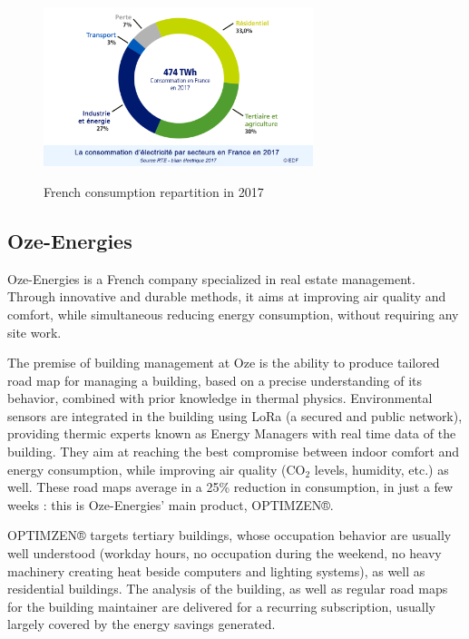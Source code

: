 \documentclass[12pt]{article}
\begin{document}
\begin{figure}
    \caption{French consumption repartition in 2017}
    \centering
    \includegraphics[width=0.7\textwidth]{energie_consommation_secteurs_2018.png}
    \label{fig:consumption_repartition}
\end{figure}

\subsection{Oze-Energies}

Oze-Energies is a French company specialized in real estate management. Through innovative and durable methods, it aims at improving air quality and comfort, while simultaneous reducing energy consumption, without requiring any site work.

The premise of building management at Oze is the ability to produce tailored road map for managing a building, based on a precise understanding of its behavior, combined with prior knowledge in thermal physics. Environmental sensors are integrated in the building using LoRa (a secured and public network), providing thermic experts known as Energy Managers with real time data of the building. They aim at reaching the best compromise between indoor comfort and energy consumption, while improving air quality (\ensuremath{\mathrm{CO_2}} levels, humidity, etc.) as well. These road maps average in a 25\% reduction in consumption, in just a few weeks : this is Oze-Energies' main product, OPTIMZEN®.

OPTIMZEN® targets tertiary buildings, whose occupation behavior are usually well understood (workday hours, no occupation during the weekend, no heavy machinery creating heat beside computers and lighting systems), as well as residential buildings. The analysis of the building, as well as regular road maps for the building maintainer are delivered for a recurring subscription, usually largely covered by the energy savings generated.
\end{document}
